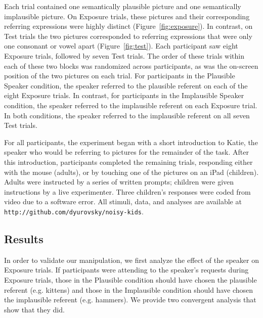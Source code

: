 \documentclass[man,floatsintext]{apa6}
\begin{document}
Each trial contained one semantically plausible picture and one semantically implausible picture. On Exposure trials, these pictures and their corresponding referring expressions were highly distinct (Figure~\ref{fig:exposure}). In contrast, on Test trials the two pictures corresponded to referring expressions that were only one consonant or vowel apart (Figure~\ref{fig:test}). Each participant saw eight Exposure trials, followed by seven Test trials. The order of these trials within each of these two blocks was randomized across participants, as was the on-screen position of the two pictures on each trial. For participants in the Plausible Speaker condition, the speaker referred to the plausible referent on each of the eight Exposure trials. In contrast, for participants in the Implausible Speaker condition, the speaker referred to the implausible referent on each Exposure trial. In both conditions, the speaker referred to the implausible referent on all seven Test trials.

For all participants, the experiment began with a short introduction to Katie, the speaker who would be referring to pictures for the remainder of the task. After this introduction, participants completed the remaining trials, responding either with the mouse (adults), or by touching one of the pictures on an iPad (children). Adults were instructed by a series of written prompts; children were given instructions by a live experimenter. Three children's responses were coded from video due to a software error. All stimuli, data, and analyses are available at {\small \tt{http://github.com/dyurovsky/noisy-kids}}.

\subsection{Results}

In order to validate our manipulation, we first analyze the effect of the speaker on Exposure trials. If participants were attending to the speaker's requests during Exposure trials, those in the Plausible condition should have chosen the plausible referent (e.g. kittens) and those in the Implausible condition should have chosen the implausible referent (e.g. hammers). We provide two convergent analysis that show that they did.
\end{document}
